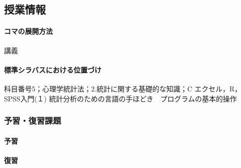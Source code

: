 \subsection{授業情報}
\paragraph{コマの展開方法}
講義
\paragraph{標準シラバスにおける位置づけ}
科目番号5；心理学統計法；2.統計に関する基礎的な知識；C エクセル，R，SPSS入門(１) 統計分析のための言語の手ほどき　プログラムの基本的操作
\subsubsection{予習・復習課題}
\paragraph{予習}
\paragraph{復習}
